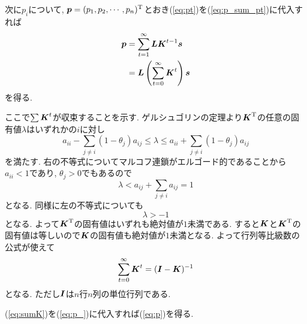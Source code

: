 次に$ p_i $について, $ \boldsymbol{p} = (p_1 , p_2 , \cdots , p_n)^\mathrm{T} $とおき(\ref{eq:pt})を(\ref{eq:p_sum_pt})に代入すれば
\begin{align}
    \boldsymbol{p} &= \sum_{t=1}^{\infty} \boldsymbol{L} \boldsymbol{K}^{t - 1} \boldsymbol{s} \nonumber \\
    &= \boldsymbol{L} \left( \sum_{t=0}^{\infty} \boldsymbol{K}^t \right) \boldsymbol{s} \label{eq:p_}
\end{align}
を得る. 

ここで$ \sum \boldsymbol{K}^t $が収束することを示す. 
ゲルシュゴリンの定理\cite{s_saito}より$ \boldsymbol{K}^\mathrm{T} $の任意の固有値$ \lambda $はいずれかの$ i $に対し
\begin{equation*}
    a_{i i} - \sum_{j \ne i}(1 - \theta_j) a_{i j} \le \lambda \le a_{i i} + \sum_{j \ne i}(1 - \theta_j) a_{i j}
\end{equation*}
を満たす. 右の不等式についてマルコフ連鎖がエルゴード的であることから$ a_{i i} < 1 $\cite{funaki}であり, $ \theta_j > 0 $でもあるので
\begin{equation*}
    \lambda < a_{i j} + \sum_{j \ne i} a_{i j} = 1
\end{equation*}
となる. 同様に左の不等式についても
\begin{equation*}
    \lambda > -1
\end{equation*}
となる. よって$ \boldsymbol{K}^\mathrm{T} $の固有値はいずれも絶対値が$ 1 $未満である. すると$ \boldsymbol{K} $と$ \boldsymbol{K}^\mathrm{T} $の固有値は等しいので$ \boldsymbol{K} $の固有値も絶対値が$ 1 $未満となる. 
よって行列等比級数の公式\cite{m_saito}が使えて
\begin{equation} \label{eq:sumK}
    \sum_{t=0}^{\infty} \boldsymbol{K}^t = (\boldsymbol{I} - \boldsymbol{K})^{-1}
\end{equation}
となる. ただし$ \boldsymbol{I} $は$ n $行$ n $列の単位行列である. 

(\ref{eq:sumK})を(\ref{eq:p_})に代入すれば(\ref{eq:p})を得る. 
